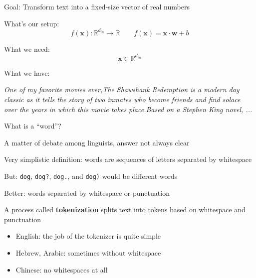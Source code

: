 \documentclass[12pt,aspectratio=169,handout]{beamer}
\begin{document}
\begin{frame}{Goal: Transform text into a fixed-size vector of real numbers}

What's our setup:
$$f(\bm{x}) : \mathbb{R}^{d_{in}} \to \mathbb{R} \qquad
f(\bm{x}) = \bm{x} \cdot \bm{w} + b$$

What we need:
$$\bm{x} \in \mathbb{R}^{d_{in}}$$

What we have:

\emph{One of my favorite movies ever,The Shawshank Redemption is a modern day classic as it tells the story of two inmates who become friends and find solace over the years in which this movie takes place.Based on a Stephen King novel, ...}

\end{frame}


\begin{frame}{What is a ``word''?}

A matter of debate among linguists, answer not always clear

Very simplistic definition: words are sequences of letters separated by whitespace

But: \texttt{dog}, \texttt{dog?}, \texttt{dog.}, and \texttt{dog)} would be different words

Better: words separated by whitespace or punctuation

A process called \textbf{tokenization} splits text into tokens based on whitespace and punctuation

\begin{itemize}
	\item English: the job of the tokenizer is quite simple
	\item Hebrew, Arabic: sometimes without whitespace
	\item Chinese: no whitespaces at all
\end{itemize}



\end{frame}
\end{document}
